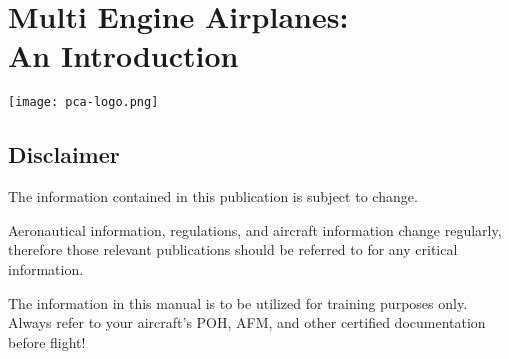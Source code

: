 
\chapter*{Multi Engine Airplanes:\\An Introduction}

\begin{center}
\texttt{[image: pca-logo.png]}
\end{center}

%
%
%
%
%

\section*{Disclaimer}

The information contained in this publication is subject to change.

Aeronautical information, regulations, and aircraft information change regularly, therefore those relevant
publications should be referred to for any critical information.

The information in this manual is to be utilized for training purposes only. Always
refer to your aircraft's POH, AFM, and other certified documentation before flight!
